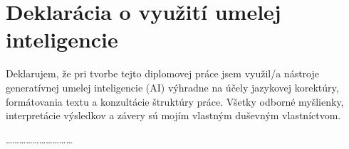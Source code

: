 \chapter*{Deklarácia o využití umelej inteligencie}

Deklarujem, že pri tvorbe tejto diplomovej práce jsem využil/a nástroje generatívnej umelej inteligencie (AI) výhradne na účely jazykovej korektúry, formátovania textu a konzultácie štruktúry práce. Všetky odborné myšlienky, interpretácie výsledkov a závery sú mojím vlastným duševným vlastníctvom.

\vspace{2cm}
\hfill \dots\dots\dots\dots\dots\dots\dots\dots\dots\dots
